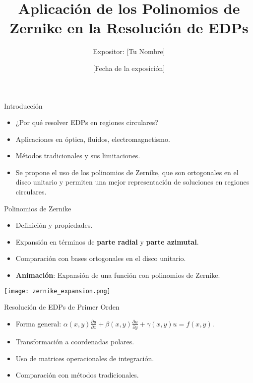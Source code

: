 \documentclass{beamer}
\title{Aplicaci\'on de los Polinomios de Zernike en la Resoluci\'on de EDPs}
\author{Expositor: [Tu Nombre]}
\date{[Fecha de la exposición]}
\begin{document}
\begin{frame}
    \titlepage
\end{frame}

\begin{frame}{Introducción}
    \begin{itemize}
        \item ¿Por qué resolver EDPs en regiones circulares?
        \item Aplicaciones en óptica, fluidos, electromagnetismo.
        \item Métodos tradicionales y sus limitaciones.
        \item Se propone el uso de los polinomios de Zernike, que son ortogonales en el disco unitario y permiten una mejor representación de soluciones en regiones circulares.
    \end{itemize}
\end{frame}

\begin{frame}{Polinomios de Zernike}
    \begin{itemize}
        \item Definición y propiedades.
        \item Expansión en términos de \textbf{parte radial} y \textbf{parte azimutal}.
        \item Comparación con bases ortogonales en el disco unitario.
        \item \textbf{Animación}: Expansión de una función con polinomios de Zernike.
    \end{itemize}
    \centering
    \texttt{[image: zernike\_expansion.png]} %
\end{frame}

\begin{frame}{Resolución de EDPs de Primer Orden}
    \begin{itemize}
        \item Forma general: $\alpha(x, y) \frac{\partial u}{\partial x} + \beta(x, y) \frac{\partial u}{\partial y} + \gamma(x, y) u = f(x, y)$.
        \item Transformación a coordenadas polares.
        \item Uso de matrices operacionales de integración.
        \item Comparación con métodos tradicionales.
    \end{itemize}
\end{frame}
\end{document}
